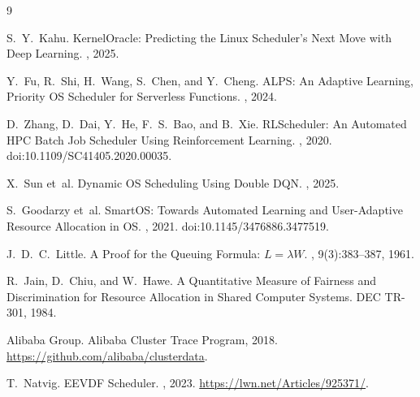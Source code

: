 \documentclass[10pt,twocolumn]{article}
\theoremstyle{remark}
\begin{document}

\begin{thebibliography}{9}

  S.~Y.~Kahu.
  \newblock KernelOracle: Predicting the Linux Scheduler's Next Move
  with Deep Learning.
  , 2025.

  Y.~Fu, R.~Shi, H.~Wang, S.~Chen, and Y.~Cheng.
  \newblock ALPS: An Adaptive Learning, Priority OS Scheduler for
  Serverless Functions.
  , 2024.

  D.~Zhang, D.~Dai, Y.~He, F.~S.~Bao, and B.~Xie.
  \newblock RLScheduler: An Automated HPC Batch Job Scheduler Using
  Reinforcement Learning.
  , 2020. doi:10.1109/SC41405.2020.00035.

  X.~Sun et~al.
  \newblock Dynamic OS Scheduling Using Double DQN.
  , 2025.

  S.~Goodarzy et~al.
  \newblock SmartOS: Towards Automated Learning and User-Adaptive
  Resource Allocation in OS.
  , 2021. doi:10.1145/3476886.3477519.

  J.~D.~C.~Little.
  \newblock A Proof for the Queuing Formula: $L = \lambda W$.
  , 9(3):383--387, 1961.

  R.~Jain, D.~Chiu, and W.~Hawe.
  \newblock A Quantitative Measure of Fairness and Discrimination for
  Resource Allocation in Shared Computer Systems.
  \newblock DEC TR-301, 1984.

  Alibaba Group.
  \newblock Alibaba Cluster Trace Program, 2018.
  \newblock \url{https://github.com/alibaba/clusterdata}.

  T.~Natvig.
  \newblock EEVDF Scheduler.
  , 2023.
  \newblock \url{https://lwn.net/Articles/925371/}.

\end{thebibliography}
\end{document}
